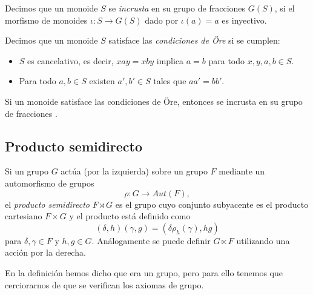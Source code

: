 \documentclass[TFG.tex]{subfiles}
\begin{document}
\begin{defi}
Decimos que un monoide $S$ se \emph{incrusta} en su grupo de fracciones $G(S)$, si el morfismo de monoides $\iota: S\to G(S)$ dado por $\iota(a)=a$ es inyectivo.
\end{defi}

\begin{defi}\label{condiciones}
Decimos que un monoide $S$ satisface las \emph{condiciones de Öre} \cite{Ore} si se cumplen:
\begin{itemize}
\item $S$ es cancelativo, es decir, $xay=xby$ implica $a=b$ para todo $x,y,a,b\in S$. 
\item Para todo $a,b\in S$ existen $a',b'\in S$ tales que $aa'=bb'$. 
\end{itemize}
\end{defi}

\begin{prop}
Si un monoide satisface las condiciones de Öre, entonces se incrusta en su grupo de fracciones \cite{Luis}.
\end{prop}

\subsection{Producto semidirecto}

\begin{defi}
Si un grupo $G$ actúa (por la izquierda) sobre un grupo $F$ mediante un automorfismo de grupos
\[
\rho: G\to Aut(F),
\]
el \emph{producto semidirecto} $F\rtimes G$ es el grupo cuyo conjunto subyacente es el producto cartesiano $F\times G$ y el producto está definido como 
\[
(\delta,h)(\gamma,g)=(\delta\rho_h(\gamma),hg)
\]
para $\delta,\gamma\in F$ y $h,g\in G$. Análogamente se puede definir $G\ltimes F$ utilizando una acción por la derecha. 
\end{defi}

En la definición hemos dicho que era un grupo, pero para ello tenemos que cerciorarnos de que se verifican los axiomas de grupo.
\end{document}
